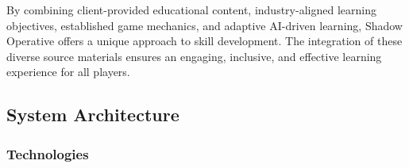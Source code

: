\documentclass[11pt, a4paper]{article}
\begin{document}
\noindent By combining client-provided educational content, industry-aligned learning objectives, established game mechanics, and adaptive AI-driven learning, Shadow Operative offers a unique approach to skill development. The integration of these diverse source materials ensures an engaging, inclusive, and effective learning experience for all players.


\newpage

\subsection{System Architecture}

\subsubsection{Technologies}
\end{document}

